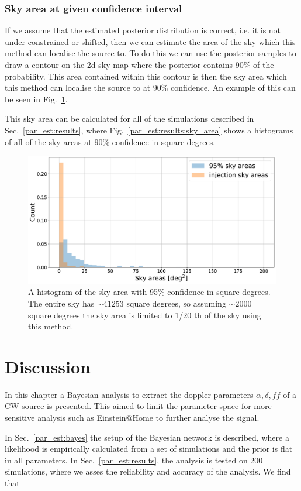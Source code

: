\subsubsection{Sky area at given confidence interval}

If we assume that the estimated posterior distribution is correct, i.e. it is not under constrained or shifted, then we can estimate the area of the sky which this method can localise the source to. 
To do this we can use the posterior samples to draw a contour on the 2d sky map where the posterior contains 90\% of the probability.
This area contained within this contour is then the sky area which this method can localise the source to at 90\% confidence.
An example of this can be seen in Fig.~\ref{}.

This sky area can be calculated for all of the simulations described in Sec.~\ref{par_est:results}, where Fig.~\ref{par_est:results:sky_area} shows a histograms of all of the sky areas at 90\% confidence in square degrees.
%
\begin{figure}[ht]
    \centering
    \includegraphics[width=\linewidth]{C5_parameter/sky_area_hist.pdf}
    \caption[p-p plot for the CW simulations]{A histogram of the sky area with 95\% confidence in square degrees. The entire sky has $\sim 41253$ square degrees, so assuming $\sim 2000$ square degrees  the sky area is limited to 1/20 th of the sky using this method. }
    \label{par_est:results:sky_Area}
\end{figure}





%
%
\section{Discussion}
%
%

In this chapter a Bayesian analysis to extract the doppler parameters $\alpha, \delta, f \dot{f}$ of a \gls{CW} source is presented.
This aimed to limit the parameter space for more sensitive analysis such as  Einstein@Home \citep{} to further analyse the signal. 

In Sec.~\ref{par_est:bayes} the setup of the Bayesian network is described, where a likelihood is empirically calculated from a set of simulations and the prior is flat in all parameters.
In Sec.~\ref{par_est:results}, the analysis is tested on 200 simulations, where we asses the reliability and accuracy of the analysis.
We find that 


